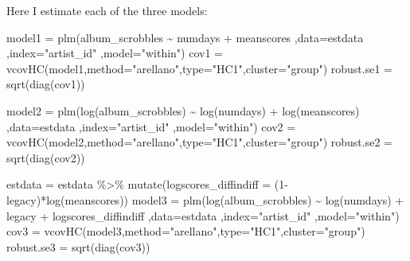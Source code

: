 \documentclass[
  11pt,
]{article}
\newenvironment{Shaded}{\begin{snugshade}}{\end{snugshade}}
\newcommand{\AttributeTok}[1]{\textcolor[rgb]{0.77,0.63,0.00}{#1}}
\newcommand{\DecValTok}[1]{\textcolor[rgb]{0.00,0.00,0.81}{#1}}
\newcommand{\FunctionTok}[1]{\textcolor[rgb]{0.00,0.00,0.00}{#1}}
\newcommand{\NormalTok}[1]{#1}
\newcommand{\OtherTok}[1]{\textcolor[rgb]{0.56,0.35,0.01}{#1}}
\newcommand{\SpecialCharTok}[1]{\textcolor[rgb]{0.00,0.00,0.00}{#1}}
\newcommand{\StringTok}[1]{\textcolor[rgb]{0.31,0.60,0.02}{#1}}
\begin{document}
Here I estimate each of the three models:

\begin{Shaded}
\begin{Highlighting}[]
\NormalTok{model1 }\OtherTok{=} \FunctionTok{plm}\NormalTok{(album\_scrobbles }\SpecialCharTok{\textasciitilde{}}\NormalTok{ numdays }\SpecialCharTok{+}\NormalTok{ meanscores}
\NormalTok{          ,}\AttributeTok{data=}\NormalTok{estdata}
\NormalTok{          ,}\AttributeTok{index=}\StringTok{"artist\_id"}
\NormalTok{          ,}\AttributeTok{model=}\StringTok{"within"}\NormalTok{)}
\NormalTok{cov1       }\OtherTok{=} \FunctionTok{vcovHC}\NormalTok{(model1,}\AttributeTok{method=}\StringTok{"arellano"}\NormalTok{,}\AttributeTok{type=}\StringTok{"HC1"}\NormalTok{,}\AttributeTok{cluster=}\StringTok{"group"}\NormalTok{)}
\NormalTok{robust.se1 }\OtherTok{=} \FunctionTok{sqrt}\NormalTok{(}\FunctionTok{diag}\NormalTok{(cov1))}

\NormalTok{model2 }\OtherTok{=} \FunctionTok{plm}\NormalTok{(}\FunctionTok{log}\NormalTok{(album\_scrobbles) }\SpecialCharTok{\textasciitilde{}} \FunctionTok{log}\NormalTok{(numdays) }\SpecialCharTok{+} \FunctionTok{log}\NormalTok{(meanscores)}
\NormalTok{          ,}\AttributeTok{data=}\NormalTok{estdata}
\NormalTok{          ,}\AttributeTok{index=}\StringTok{"artist\_id"}
\NormalTok{          ,}\AttributeTok{model=}\StringTok{"within"}\NormalTok{)}
\NormalTok{cov2       }\OtherTok{=} \FunctionTok{vcovHC}\NormalTok{(model2,}\AttributeTok{method=}\StringTok{"arellano"}\NormalTok{,}\AttributeTok{type=}\StringTok{"HC1"}\NormalTok{,}\AttributeTok{cluster=}\StringTok{"group"}\NormalTok{)}
\NormalTok{robust.se2 }\OtherTok{=} \FunctionTok{sqrt}\NormalTok{(}\FunctionTok{diag}\NormalTok{(cov2))}

\NormalTok{estdata }\OtherTok{=}\NormalTok{ estdata }\SpecialCharTok{\%\textgreater{}\%} \FunctionTok{mutate}\NormalTok{(}\AttributeTok{logscores\_diffindiff =}\NormalTok{ (}\DecValTok{1}\SpecialCharTok{{-}}\NormalTok{legacy)}\SpecialCharTok{*}\FunctionTok{log}\NormalTok{(meanscores))}
\NormalTok{model3 }\OtherTok{=} \FunctionTok{plm}\NormalTok{(}\FunctionTok{log}\NormalTok{(album\_scrobbles) }\SpecialCharTok{\textasciitilde{}} \FunctionTok{log}\NormalTok{(numdays) }\SpecialCharTok{+}\NormalTok{ legacy }\SpecialCharTok{+}\NormalTok{ logscores\_diffindiff}
\NormalTok{          ,}\AttributeTok{data=}\NormalTok{estdata}
\NormalTok{          ,}\AttributeTok{index=}\StringTok{"artist\_id"}
\NormalTok{          ,}\AttributeTok{model=}\StringTok{"within"}\NormalTok{)}
\NormalTok{cov3       }\OtherTok{=} \FunctionTok{vcovHC}\NormalTok{(model3,}\AttributeTok{method=}\StringTok{"arellano"}\NormalTok{,}\AttributeTok{type=}\StringTok{"HC1"}\NormalTok{,}\AttributeTok{cluster=}\StringTok{"group"}\NormalTok{)}
\NormalTok{robust.se3 }\OtherTok{=} \FunctionTok{sqrt}\NormalTok{(}\FunctionTok{diag}\NormalTok{(cov3))}
\end{Highlighting}
\end{Shaded}
\end{document}
